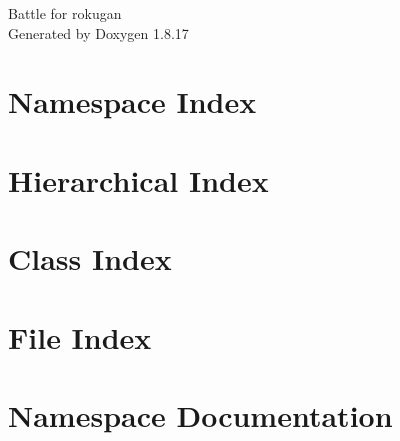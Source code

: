 \let\mypdfximage\pdfximage\def\pdfximage{\immediate\mypdfximage}\documentclass[twoside]{book}
\newcommand{\+}{\discretionary{\mbox{\scriptsize$\hookleftarrow$}}{}{}}
\newcommand{\clearemptydoublepage}{%
  \newpage{\pagestyle{empty}\cleardoublepage}%
}
\begin{document}
\hypersetup{pageanchor=false,
             bookmarksnumbered=true,
             pdfencoding=unicode
            }
\begin{titlepage}
\vspace*{7cm}
\begin{center}%
{\Large Battle for rokugan }\\
\vspace*{1cm}
{\large Generated by Doxygen 1.8.17}\\
\end{center}
\end{titlepage}
\clearemptydoublepage
{}
\tableofcontents
\clearemptydoublepage
{}
\hypersetup{pageanchor=true}

\chapter{Namespace Index}

\chapter{Hierarchical Index}

\chapter{Class Index}

\chapter{File Index}

\chapter{Namespace Documentation}





\end{document}
